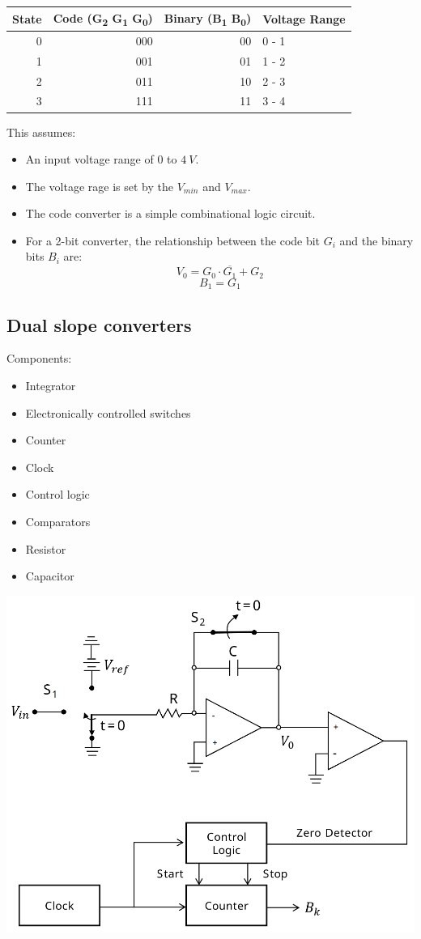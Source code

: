 \documentclass[11pt]{article}
\begin{document}
\begin{center}
\begin{tabular}{r|r|r|l}
State & Code (G\textsubscript{2} G\textsubscript{1} G\textsubscript{0}) & Binary (B\textsubscript{1} B\textsubscript{0}) & Voltage Range\\
\hline
0 & 000 & 00 & 0 - 1\\
1 & 001 & 01 & 1 - 2\\
2 & 011 & 10 & 2 - 3\\
3 & 111 & 11 & 3 - 4\\
\end{tabular}
\end{center}

This assumes:
\begin{itemize}
\item An input voltage range of 0 to \(\qty{4}{V}\).
\item The voltage rage is set by the \(V_{min}\) and \(V_{max}\).
\item The code converter is a simple combinational logic circuit.
\item For a 2-bit converter, the relationship between the code bit \(G_i\) and the binary bits \(B_i\) are:
\[V_0 = G_0 \cdot \overline{G_1} + G_2\]
\[B_1 = G_1\]
\end{itemize}
\subsection{Dual slope converters}
\label{sec:org070cd58}
Components:
\begin{itemize}
\item Integrator
\item Electronically controlled switches
\item Counter
\item Clock
\item Control logic
\item Comparators
\item Resistor
\item Capacitor
\end{itemize}

\begin{center}
\includegraphics[width=.9\linewidth]{./images/dual-slope-converters.png}
\end{center}
\end{document}
